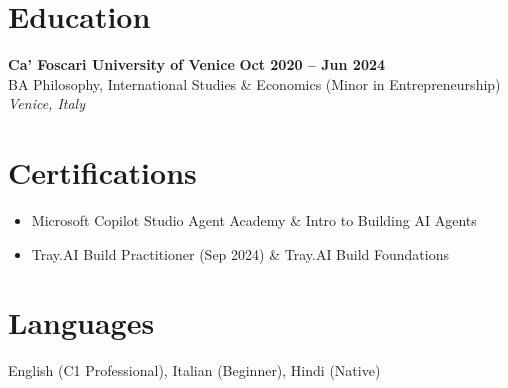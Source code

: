 \documentclass[11pt,a4paper]{article}
\begin{document}
\section{Education}
\textbf{Ca' Foscari University of Venice} \hfill \textbf{Oct 2020 -- Jun 2024} \\
BA Philosophy, International Studies \& Economics (Minor in Entrepreneurship) \hfill \textit{Venice, Italy}

\section{Certifications}
\begin{itemize}[leftmargin=*, parsep=0pt, itemsep=2pt]
    \item Microsoft Copilot Studio Agent Academy \& Intro to Building AI Agents
    \item Tray.AI Build Practitioner (Sep 2024) \& Tray.AI Build Foundations
\end{itemize}

\section{Languages}
English (C1 Professional), Italian (Beginner), Hindi (Native)
\end{document}
